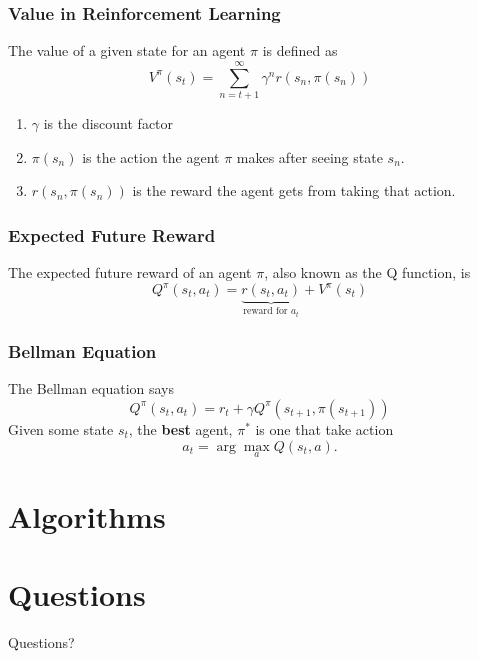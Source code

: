 \documentclass{beamer}
\numberwithin{equation}{subsection}
\numberwithin{theorem}{subsection}
\begin{document}
\begin{frame}
\frametitle{Value in Reinforcement Learning}
  The value of a given state for an agent $\pi$ is defined as 
  \begin{equation*}
    V^\pi(s_t) = \sum_{n={t+1}}^\infty \gamma^n r(s_n, \pi(s_n))
  \end{equation*} 
  \begin{enumerate}
    \item $\gamma$ is the discount factor
    \item $\pi(s_n)$ is the action the agent $\pi$ makes after seeing state $s_n$.
    \item $r(s_n, \pi(s_n))$ is the reward the agent gets from taking that action.
  \end{enumerate}
\end{frame}

\begin{frame}
\frametitle{Expected Future Reward}
  The expected future reward of an agent $\pi$, also known as the Q function, is
  \begin{equation*}
    Q^\pi(s_t, a_t) = \underbrace{r(s_t, a_t)}_{\text{reward for } a_t} + V^\pi(s_t)
  \end{equation*}
\end{frame}

\begin{frame}
\frametitle{Bellman Equation}
  The Bellman equation says 
  \begin{equation*}
    Q^\pi(s_t, a_t) = r_t + \gamma Q^\pi(s_{t+1}, \pi(s_{t+1}))
  \end{equation*}
  Given some state $s_t$, the \textbf{best} agent, $\pi^*$ is one that take action 
  \begin{equation*}
    a_t = \arg \max_a Q(s_t, a).   
  \end{equation*}
\end{frame}

\section{Algorithms}
\section{Questions}
\begin{frame}
\Huge{\centerline{Questions?}}
\end{frame}

\end{document}
